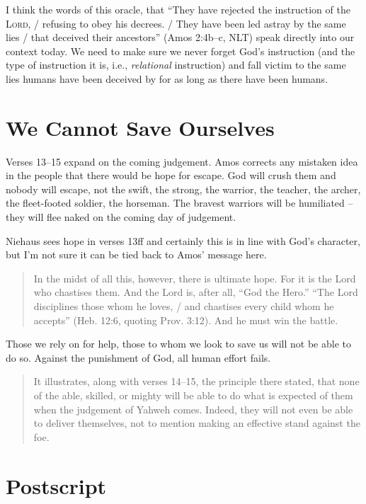 I think the words of this oracle, that \enquote{They have rejected the
instruction of the \textsc{Lord}, / refusing to obey his decrees. / They have
been led astray by the same lies / that deceived their ancestors} (Amos 2:4b--c,
NLT) speak directly into our context today. We need to make sure we never forget
God's instruction (and the type of instruction it is, i.e., \textit{relational}
instruction) and fall victim to the same lies humans have been deceived by for
as long as there have been humans.

\section{We Cannot Save Ourselves}

Verses 13--15 expand on the coming judgement. Amos corrects any mistaken idea in
the people that there would be hope for escape. God will crush them and nobody
will escape, not the swift, the strong, the warrior, the teacher, the archer,
the fleet-footed soldier, the horseman. The bravest warriors will be humiliated
-- they will flee naked on the coming day of judgement.

Niehaus sees hope in verses 13ff and certainly this is in line with God's
character, but I'm not sure it can be tied back to Amos' message here.

\begin{quote}
    In the midst of all this, however, there is ultimate hope. For it is the
    Lord who chastises them. And the Lord is, after all, \enquote{God the Hero.}
    \enquote{The Lord disciplines those whom he loves, / and chastises every
    child whom he accepts} (Heb. 12:6, quoting Prov. 3:12). And he must win the
    battle.
    \autocite[372]{mccomiskey:2009}
\end{quote}

Those we rely on for help, those to whom we look to save us will not be able to
do so. Against the punishment of God, all human effort fails.

\begin{quote}
    It illustrates, along with verses 14--15, the principle there stated, that
    none of the able, skilled, or mighty will be able to do what is expected of
    them when the judgement of Yahweh comes. Indeed, they will not even be able
    to deliver themselves, not to mention making an effective stand against the
    foe.
    \autocite[373]{mccomiskey:2009}
\end{quote}

\section*{Postscript}

